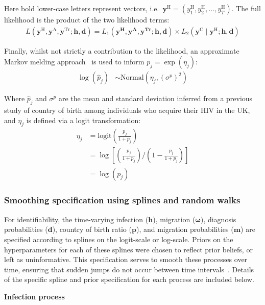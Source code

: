 \documentclass[11pt, a4paper]{article}
\begin{document}
Here bold lower-case letters represent vectors, i.e.\ $\bm{y}^\text{H} = (y_1^\text{H}, y_2^\text{H}, \ldots, y_T^\text{H})$. The full likelihood is the product of the two likelihood terms:
%
\begin{align*}
  L(\bm{y}^\text{H}, \bm{y}^\text{A},\bm{y}^\text{Tr};\bm{h},\bm{d}) = L_1(\bm{y^\text{H}}, \bm{y^\text{A}}, \bm{y^\text{Tr}};\bm{h},\bm{d}) \times L_2(\bm{y}^\text{C} \mid \bm{y}^\text{H};\bm{h},\bm{d})
\end{align*}

Finally, whilst not strictly a contribution to the likelihood, an approximate Markov melding approach~\cite{goudie_joining_2019} is used to inform $p_j = \exp(\eta_j)$:
%
\begin{align*}
    \log(\hat{p}_j) &\sim \text{Normal}(\eta_j, (\sigma^p)^2)
\end{align*}

Where $\hat{p}_j$ and $\sigma^{p}$ are the mean and standard deviation inferred from a previous study of country of birth among individuals who acquire their HIV in the UK, and $\eta_j$ is defined via a logit transformation:
%
\begin{align*}
    \eta_j &= \text{logit}\left(\frac{p_j}{1+p_j}\right) \\
        &= \log\left[\left(\frac{p_j}{1+p_j}\right) / \left(1 - \frac{p_j}{1+p_j}\right)\right]\\
        &= \log(p_j)
\end{align*}

\subsubsection{Smoothing specification using splines and random walks}

For identifiability, the time-varying infection ($\bm{h}$), migration ($\bm{\omega})$, diagnosis probabilities ($\bm{d}$), country of birth ratio ($\bm{p}$), and migration probabilities ($\bm{m}$) are specified according to splines on the logit-scale or log-scale. Priors on the hyperparameters for each of these splines were chosen to reflect prior beliefs, or left as uninformative. This specification serves to smooth these processes over time, ensuring that sudden jumps do not occur between time intervals~\parencite{birrell_estimating_2012, brizzi_estimating_2017}. Details of the specific spline and prior specification for each process are included below.

\textbf{Infection process}
\end{document}
